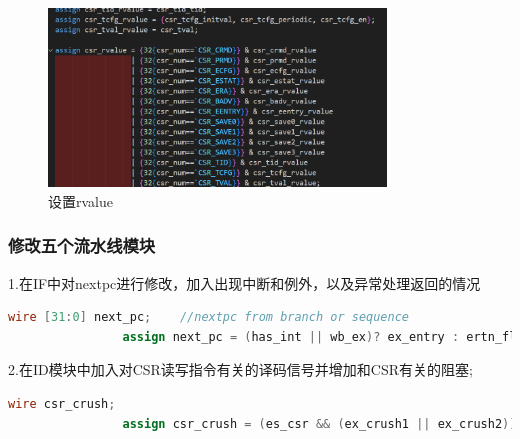 \documentclass[12pt,a4paper]{article}
\begin{document}
            \begin{figure}[H]
                \centering
                \includegraphics[width=0.8\textwidth]{rvalue.png}
                \caption{设置rvalue}
            \end{figure}
            \par
        
        \subsubsection{修改五个流水线模块}
            1.在IF中对nextpc进行修改，加入出现中断和例外，以及异常处理返回的情况
            \begin{lstlisting}[language=Verilog]
                wire [31:0] next_pc;    //nextpc from branch or sequence
                assign next_pc = (has_int || wb_ex)? ex_entry : ertn_flush? ertn_pc : br_taken? br_target : seq_pc;
            \end{lstlisting}
            \par
            2.在ID模块中加入对CSR读写指令有关的译码信号并增加和CSR有关的阻塞;
            \begin{lstlisting}[language=Verilog]
                wire csr_crush;
                assign csr_crush = (es_csr && (ex_crush1 || ex_crush2)) || (ms_csr && (mem_crush1 || mem_crush2)); 
            \end{lstlisting}
\end{document}
